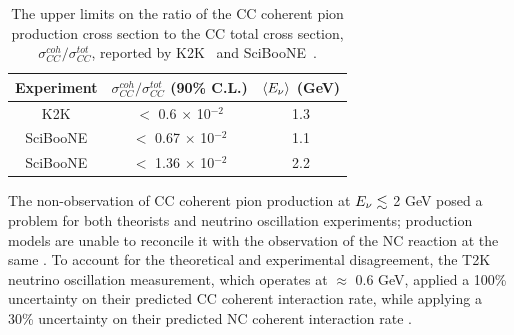 \begin{table}[h!]
\begin{center}
\begin{tabular}{ c | c | c }
Experiment & $\sigma_{CC}^{coh} / \sigma_{CC}^{tot}$ (90\% C.L.) & $\langle E_{\nu}\rangle$ (GeV) \\
\hline
K2K & $<$ 0.6 $\times$ 10$^{-2}$ & 1.3 \\
SciBooNE & $<$ 0.67 $\times$ 10$^{-2}$ & 1.1 \\
SciBooNE & $<$ 1.36 $\times$ 10$^{-2}$ & 2.2 \\
\end{tabular}
\end{center}
\caption[Upper limits on the \numu CC coherent pion production cross section reported by K2K and SciBooNE]
	{The upper limits on the ratio of the \numu CC coherent pion production cross section to the \numu CC total cross
	section, $\sigma_{CC}^{coh} / \sigma_{CC}^{tot}$, reported by K2K~\cite{bib:coh_cc_k2k} and SciBooNE~\cite{bib:coh_cc_sb}.}
\label{tab:k2k_sb_coh_cc}
\end{table}

The non-observation of CC coherent pion production at $E_{\nu}\lesssim$ 2 GeV posed a problem for both theorists and neutrino
oscillation experiments; production models are unable to reconcile it with the observation of the NC reaction at the same \enu.
To account for the theoretical and experimental disagreement, the T2K neutrino oscillation measurement, which operates at
\enu $\approx\xspace$ 0.6 GeV, applied a 100\% uncertainty on their predicted CC coherent interaction
rate, while applying a 30\% uncertainty on their predicted NC coherent interaction rate \cite{bib:t2k_osc}.  


